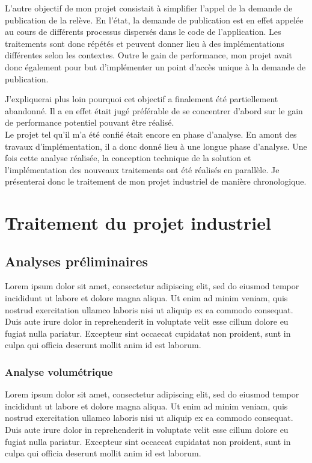 \documentclass[a4paper, 12pt]{report}
\begin{document}
L'autre objectif de mon projet consistait à simplifier l'appel de la demande de publication de la relève. En l'état, la demande de publication est en effet appelée au cours de différents processus dispersés dans le code de l'application. Les traitements sont donc répétés et peuvent donner lieu à des implémentations différentes selon les contextes. Outre le gain de performance, mon projet avait donc également pour but d'implémenter un point d'accès unique à la demande de publication.

J'expliquerai plus loin pourquoi cet objectif a finalement été partiellement abandonné. Il a en effet était jugé préférable de se concentrer d'abord sur le gain de performance potentiel pouvant être réalisé.\\

Le projet tel qu'il m'a été confié était encore en phase d'analyse. En amont des travaux d'implémentation, il a donc donné lieu à une longue phase d'analyse. Une fois cette analyse réalisée, la conception technique de la solution et l'implémentation des nouveaux traitements ont été réalisés en parallèle. Je présenterai donc le traitement de mon projet industriel de manière chronologique.

\chapter{Traitement du projet industriel}

\section{Analyses préliminaires}

Lorem ipsum dolor sit amet, consectetur adipiscing elit, sed do eiusmod tempor incididunt ut labore et dolore magna aliqua. Ut enim ad minim veniam, quis nostrud exercitation ullamco laboris nisi ut aliquip ex ea commodo consequat. Duis aute irure dolor in reprehenderit in voluptate velit esse cillum dolore eu fugiat nulla pariatur. Excepteur sint occaecat cupidatat non proident, sunt in culpa qui officia deserunt mollit anim id est laborum.

\subsection{Analyse volumétrique}

Lorem ipsum dolor sit amet, consectetur adipiscing elit, sed do eiusmod tempor incididunt ut labore et dolore magna aliqua. Ut enim ad minim veniam, quis nostrud exercitation ullamco laboris nisi ut aliquip ex ea commodo consequat. Duis aute irure dolor in reprehenderit in voluptate velit esse cillum dolore eu fugiat nulla pariatur. Excepteur sint occaecat cupidatat non proident, sunt in culpa qui officia deserunt mollit anim id est laborum.
\end{document}
